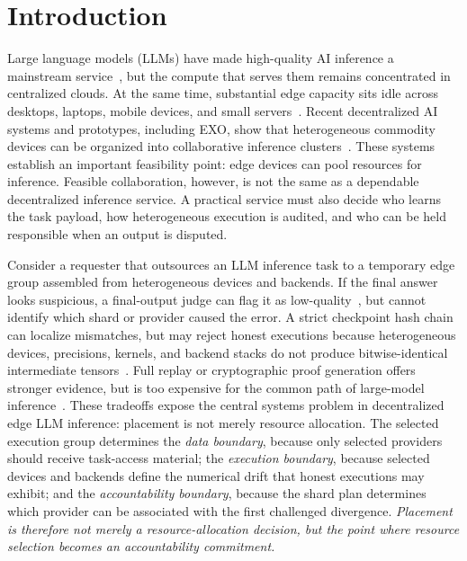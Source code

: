 \documentclass[sigplan,screen,review,anonymous]{acmart}
\begin{document}


\maketitle
\thispagestyle{empty}
\pagestyle{empty}
\raggedbottom

\section{Introduction}
\label{sec:introduction}

Large language models (LLMs) have made high-quality AI inference a
mainstream service~\cite{brown2020language,bender2021dangers}, but the
compute that serves them remains concentrated in centralized clouds. At the
same time, substantial edge capacity sits idle across desktops, laptops,
mobile devices, and small servers~\cite{deng2020edge,meuser2024revisiting}.
Recent decentralized AI systems and prototypes, including EXO, show that
heterogeneous commodity devices can be organized into collaborative
inference clusters~\cite{wang2024sok,exo_github,exo_blog}. These systems
establish an important feasibility point: edge devices can pool resources
for inference. Feasible collaboration, however, is not the same as a
dependable decentralized inference service. A practical service must also
decide who learns the task payload, how heterogeneous execution is audited,
and who can be held responsible when an output is disputed.

Consider a requester that outsources an LLM inference task to a temporary
edge group assembled from heterogeneous devices and backends. If the final
answer looks suspicious, a final-output judge can flag it as
low-quality~\cite{zheng2023judging,liu2025polylink}, but cannot identify
which shard or provider caused the error. A strict checkpoint hash chain can
localize mismatches, but may reject honest executions because heterogeneous
devices, precisions, kernels, and backend stacks do not produce
bitwise-identical intermediate tensors~\cite{goldberg1991floating,
	higham2002accuracy}. Full replay or cryptographic proof generation offers
stronger evidence, but is too expensive for the common path of
large-model inference~\cite{sun2024zkllm,ivanov2025dsperse}. These
tradeoffs expose the central systems problem in decentralized edge LLM
inference: placement is not merely resource allocation. The selected
execution group determines the \emph{data boundary}, because only selected
providers should receive task-access material; the \emph{execution
boundary}, because selected devices and backends define the numerical drift
that honest executions may exhibit; and the \emph{accountability boundary},
because the shard plan determines which provider can be associated with the
first challenged divergence. \textit{Placement is therefore not merely a resource-allocation decision, but the point where resource selection becomes an accountability commitment.}
\end{document}
